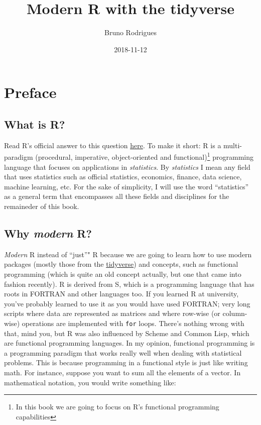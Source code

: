 \documentclass[]{gitbook}
\title{Modern R with the tidyverse}
\author{Bruno Rodrigues}
\date{2018-11-12}
\let\rmarkdownfootnote\footnote%
\def\footnote{\protect\rmarkdownfootnote}
\theoremstyle{definition}
\theoremstyle{definition}
\theoremstyle{definition}
\theoremstyle{remark}
\begin{document}
\maketitle

{
\setcounter{tocdepth}{2}
\tableofcontents
}
\hypertarget{preface}{%
\section*{Preface}\label{preface}}

\hypertarget{what-is-r}{%
\subsection*{What is R?}\label{what-is-r}}

Read R's official answer to this question
\href{https://cran.r-project.org/doc/FAQ/R-FAQ.html\#What-is-R_003f}{here}.
To make it short: R is a multi-paradigm (procedural, imperative,
object-oriented and functional)\footnote{In this book we are going to
  focus on R's functional programming capabilities} programming language
that focuses on applications in \emph{statistics}. By \emph{statistics}
I mean any field that uses statistics such as official statistics,
economics, finance, data science, machine learning, etc. For the sake of
simplicity, I will use the word ``statistics'' as a general term that
encompasses all these fields and disciplines for the remaineder of this
book.

\hypertarget{why-modern-r}{%
\subsection*{\texorpdfstring{Why \emph{modern}
R?}{Why modern R?}}\label{why-modern-r}}

\emph{Modern} R instead of ``just''" R because we are going to learn how
to use modern packages (mostly those from the
\href{https://www.tidyverse.org/}{tidyverse}) and concepts, such as
functional programming (which is quite an old concept actually, but one
that came into fashion recently). R is derived from S, which is a
programming language that has roots in FORTRAN and other languages too.
If you learned R at university, you've probably learned to use it as you
would have used FORTRAN; very long scripts where data are represented as
matrices and where row-wise (or column-wise) operations are implemented
with \texttt{for} loops. There's nothing wrong with that, mind you, but
R was also influenced by Scheme and Common Lisp, which are functional
programming languages. In my opinion, functional programming is a
programming paradigm that works really well when dealing with
statistical problems. This is because programming in a functional style
is just like writing math. For instance, suppose you want to sum all the
elements of a vector. In mathematical notation, you would write
something like:
\end{document}
